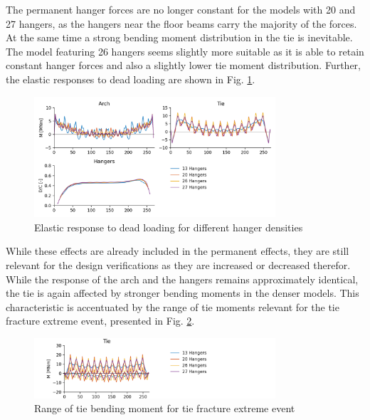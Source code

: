 The permanent hanger forces are no longer constant for the models with 20 and 27 hangers, as the hangers near the floor beams carry the majority of the forces. At the same time a strong bending moment distribution in the tie is inevitable. The model featuring 26 hangers seems slightly more suitable as it is able to retain constant hanger forces and also a slightly lower tie moment distribution. Further, the elastic responses to dead loading are shown in Fig. \ref{fig:hd_elastic_response_dl}.

\begin{figure}[H]
    \centering
    \includegraphics[width=0.8\textwidth]{calculations/hanger amount comparison/dead load.png}
    \caption{Elastic response to dead loading for different hanger densities}
    \label{fig:hd_elastic_response_dl}
\end{figure}

While these effects are already included in the permanent effects, they are still relevant for the design verifications as they are increased or decreased therefor. While the response of the arch and the hangers remains approximately identical, the tie is again affected by stronger bending moments in the denser models. This characteristic is accentuated by the range of tie moments relevant for the tie fracture extreme event, presented in Fig. \ref{fig:hd_tie_fracture}.

\begin{figure}[H]
    \centering
    \includegraphics[trim={0 0 3cm 0},clip, width=0.8\textwidth]{calculations/hanger amount comparison/tie fracture.png}
    \caption{Range of tie bending moment for tie fracture extreme event}
    \label{fig:hd_tie_fracture}
\end{figure}

